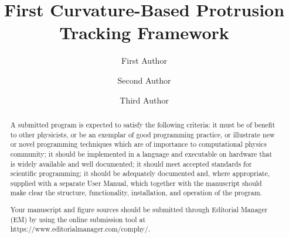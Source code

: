 \documentclass[preprint,12pt]{elsarticle}
\begin{document}
\begin{frontmatter}



\title{First Curvature-Based Protrusion Tracking Framework}


\author[a]{First Author}
\author[a,b]{Second Author}
\author[b]{Third Author}

\address[a]{First Address}
\address[b]{Second Address}

\begin{abstract}
A submitted program is expected to satisfy the following criteria: it must be of benefit to other physicists, or be an exemplar of good programming practice, or illustrate new or novel programming techniques which are of importance to computational physics community; it should be implemented in a language and executable on hardware that is widely available and well documented; it should meet accepted standards for scientific programming; it should be adequately documented and, where appropriate, supplied with a separate User Manual, which together with the manuscript should make clear the structure, functionality, installation, and operation of the program.

Your manuscript and figure sources should be submitted through Editorial Manager (EM) by using the online submission tool at \\
https://www.editorialmanager.com/comphy/.


\end{abstract}
\end{frontmatter}
\end{document}
